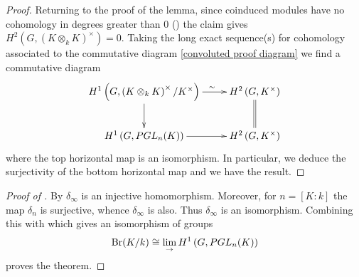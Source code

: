 \documentclass[11pt]{amsart}
\numberwithin{equation}{section}
\theoremstyle{remark}
\theoremstyle{remark}
\theoremstyle{remark}
\theoremstyle{definition}
\theoremstyle{definition}
\theoremstyle{definition}
\theoremstyle{definition}
\theoremstyle{definition}
\theoremstyle{definition}
\begin{document}
\begin{proof}

Returning to the proof of the lemma, since coinduced modules have no cohomology in degrees greater than $0$ () the claim gives $H^2\left(G,(K\otimes_k K)^{\times}\right)=0$. Taking the long exact sequence(s) for cohomology associated to the commutative diagram $\!$\cref{convoluted proof diagram} we find a commutative diagram
\[\xymatrix{H^1\left(G,\left(K\otimes_{k}K\right)^{\times}/K^{\times}\right)\ar[d]\ar[r]^{\phantom{hellooo}\sim}&H^2\left(G,K^{\times}\right)\ar@{=}[d]\\
H^1\left(G,PGL_n(K)\right)\ar[r]&H^2\left(G,K^{\times}\right)}\]
where the top horizontal map is an isomorphism.
In particular, we deduce the surjectivity of the bottom horizontal map and we have the result. 
\end{proof}

\begin{proof}[Proof of ]
By  $\delta_\infty$ is an injective homomorphism. Moreover, for $n=[K:k]$ the map $\delta_n$ is surjective, whence $\delta_\infty$ is also. Thus $\delta_\infty$ is an isomorphism. Combining this with  which gives an isomorphism of groups
\[\textup{Br}(K/k)\cong \lim_{\rightarrow}H^1\left(G,PGL_n(K)\right)\]
proves the theorem.
\end{proof}
\end{document}
